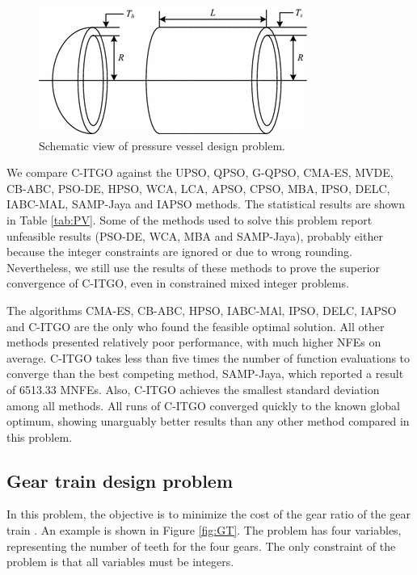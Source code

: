 \begin{figure}[h]
\begin{center}
\includegraphics[scale=0.6]{Imgs/PV.png}
\end{center}
\captionsetup{justification=centering}
\caption{Schematic view of pressure vessel design problem.}\label{fig:PV}
\end{figure}


We compare C-ITGO against the UPSO, QPSO, G-QPSO, CMA-ES, MVDE, CB-ABC, PSO-DE, HPSO, WCA, LCA, APSO, CPSO, MBA, IPSO, DELC, IABC-MAL, SAMP-Jaya and IAPSO methods. The statistical results are shown in Table \ref{tab:PV}. Some of the methods used to solve this problem report unfeasible results (PSO-DE, WCA, MBA and SAMP-Jaya), probably either because the integer constraints are ignored or due to wrong rounding. Nevertheless, we still use the results of these methods to prove the superior convergence of C-ITGO, even in constrained mixed integer problems.





The algorithms CMA-ES, CB-ABC, HPSO, IABC-MAl, IPSO, DELC, IAPSO and C-ITGO are the only who found the feasible optimal solution. All other methods presented relatively poor performance, with much higher NFEs on average. C-ITGO takes less than five times the number of function evaluations to converge than the best competing method, SAMP-Jaya, which reported a result of 6513.33 MNFEs. Also, C-ITGO achieves the smallest standard deviation among all methods. All runs of C-ITGO converged quickly to the known global optimum, showing unarguably better results than any other method compared in this problem.



\subsection{Gear train design problem}

In this problem, the objective is to minimize the cost of the gear ratio of the gear train \citep{PV}. An example is shown in Figure \ref{fig:GT}. The problem has four variables, representing the number of teeth for the four gears. The only constraint of the problem is that all variables must be integers.


